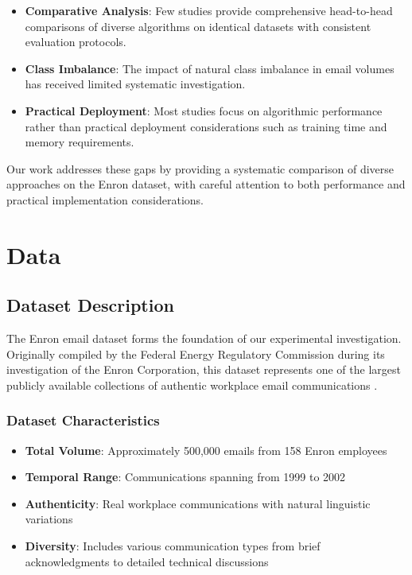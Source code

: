 \documentclass[11pt,a4paper]{article}
\begin{document}
\begin{itemize}
    \item \textbf{Comparative Analysis}: Few studies provide comprehensive head-to-head comparisons of diverse algorithms on identical datasets with consistent evaluation protocols.
    
    \item \textbf{Class Imbalance}: The impact of natural class imbalance in email volumes has received limited systematic investigation.
    
    \item \textbf{Practical Deployment}: Most studies focus on algorithmic performance rather than practical deployment considerations such as training time and memory requirements.
\end{itemize}

Our work addresses these gaps by providing a systematic comparison of diverse approaches on the Enron dataset, with careful attention to both performance and practical implementation considerations.

\section{Data}

\subsection{Dataset Description}

The Enron email dataset forms the foundation of our experimental investigation. Originally compiled by the Federal Energy Regulatory Commission during its investigation of the Enron Corporation, this dataset represents one of the largest publicly available collections of authentic workplace email communications \cite{klimt2004enron}.

\subsubsection{Dataset Characteristics}

\begin{itemize}
    \item \textbf{Total Volume}: Approximately 500,000 emails from 158 Enron employees
    \item \textbf{Temporal Range}: Communications spanning from 1999 to 2002
    \item \textbf{Authenticity}: Real workplace communications with natural linguistic variations
    \item \textbf{Diversity}: Includes various communication types from brief acknowledgments to detailed technical discussions
\end{itemize}
\end{document}
